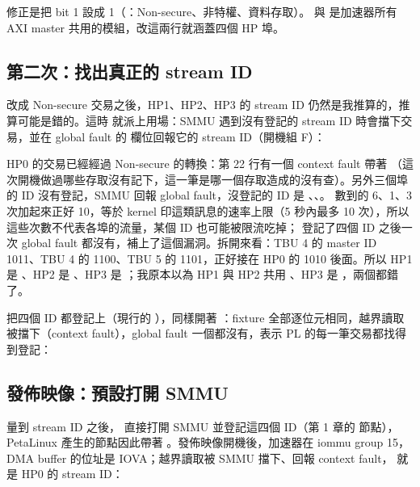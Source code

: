 
修正是把 bit 1 設成 1（：Non-secure、非特權、資料存取）。 與  是加速器所有 AXI master 共用的模組，改這兩行就涵蓋四個 HP 埠。

\subsection{第二次：找出真正的 stream ID}

改成 Non-secure 交易之後，HP1、HP2、HP3 的 stream ID 仍然是我推算的，推算可能是錯的。這時  就派上用場：SMMU 遇到沒有登記的 stream ID 時會擋下交易，並在 global fault 的  欄位回報它的 stream ID（開機組 F）：


HP0 的交易已經經過 Non-secure 的轉換：第 22 行有一個 context fault 帶著 （這次開機做過哪些存取沒有記下，這一筆是哪一個存取造成的沒有查）。另外三個埠的 ID 沒有登記，SMMU 回報 global fault，沒登記的 ID 是 、、。 數到的 6、1、3 次加起來正好 10，等於 kernel 印這類訊息的速率上限（5 秒內最多 10 次），所以這些次數不代表各埠的流量，某個 ID 也可能被限流吃掉； 登記了四個 ID 之後一次 global fault 都沒有，補上了這個漏洞。拆開來看：TBU 4 的 master ID 1011、TBU 4 的 1100、TBU 5 的 1101，正好接在 HP0 的 1010 後面。所以 HP1 是 、HP2 是 、HP3 是 ；我原本以為 HP1 與 HP2 共用 、HP3 是 ，兩個都錯了。

把四個 ID 都登記上（現行的 ），同樣開著 ：fixture 全部逐位元相同，越界讀取被擋下（context fault），global fault 一個都沒有，表示 PL 的每一筆交易都找得到登記：


\subsection{發佈映像：預設打開 SMMU}

量到 stream ID 之後， 直接打開 SMMU 並登記這四個 ID（第 1 章的  節點），PetaLinux 產生的節點因此帶著 。發佈映像開機後，加速器在 iommu group 15，DMA buffer 的位址是 IOVA；越界讀取被 SMMU 擋下、回報 context fault， 就是 HP0 的 stream ID：


